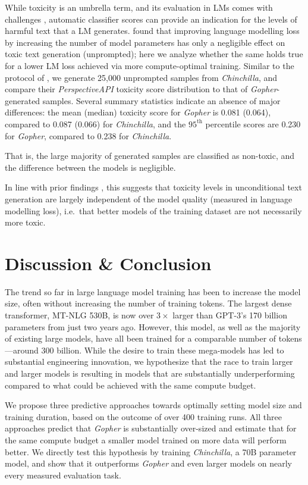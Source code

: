 While toxicity is an umbrella term, and its evaluation in LMs comes with challenges \citep{xu2021detoxifying,welbl2021challenges}, automatic classifier scores can provide an indication for the levels of harmful text that a LM generates. 
\citet{rae2021gopher} found that improving language modelling loss by increasing the number of model parameters has only a negligible effect on toxic text generation (unprompted); here we analyze whether the same holds true for a lower LM loss achieved via more compute-optimal training. Similar to the protocol of \citet{rae2021gopher}, we generate 25,000 unprompted samples from \textit{Chinchilla}, and compare their \textit{PerspectiveAPI} toxicity score distribution to that of \textit{Gopher}-generated samples. Several summary statistics indicate an absence of major differences: the mean (median) toxicity score for \textit{Gopher} is 0.081 (0.064), compared to 0.087 (0.066) for \textit{Chinchilla}, and the $95^{\textrm{th}}$ percentile scores are 0.230 for \textit{Gopher}, compared to 0.238 for \textit{Chinchilla}. 

That is, the large majority of generated samples are classified as non-toxic, and the difference between the models is negligible.

In line with prior findings \citep{rae2021gopher}, this suggests that toxicity levels in unconditional text generation are largely independent of the model quality (measured in language modelling loss), i.e.~that better models of the training dataset are not necessarily more toxic.

\section{Discussion \& Conclusion} The trend so far in large language model training has been to increase the model size, often without increasing the number of training tokens. The largest dense transformer, MT-NLG 530B, is now over $3 \times$ larger than GPT-3's 170 billion parameters from just two years ago. However, this model, as well as the majority of existing large models, have all been trained for a comparable number of tokens---around 300 billion. While the desire to train these mega-models has led to substantial engineering innovation, we hypothesize that the race to train larger and larger models is resulting in models that are substantially underperforming compared to what could be achieved with the same compute budget.

We propose three predictive approaches towards optimally setting model size and training duration, based on the outcome of over 400  training runs. All three approaches predict that \textit{Gopher} is substantially over-sized and estimate that for the same compute budget a smaller model trained on more data will perform better. We directly test this hypothesis by training \textit{Chinchilla}, a 70B parameter model, and show that it outperforms \textit{Gopher} and even larger models on nearly every measured evaluation task.

